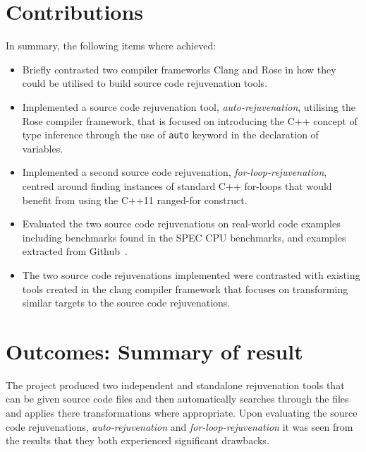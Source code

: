 \documentclass[bsc,frontabs,singlespacing,twoside,parskip,deptreport]{infthesis}
\begin{document}

    
\section{Contributions}
In summary, the following items where achieved:
\begin{itemize}
    \item Briefly contrasted two compiler frameworks Clang and Rose in how they could be utilised to build source code rejuvenation tools.
    \item Implemented a source code rejuvenation tool, \textit{auto-rejuvenation}, utilising the Rose compiler framework, that is focused on introducing the C++ concept of type inference through the use of \texttt{auto} keyword in the declaration of variables.
    \item Implemented a second source code rejuvenation, \textit{for-loop-rejuvenation}, centred around finding instances of standard  C++ for-loops that would benefit from using the C++11 ranged-for construct. 
    \item Evaluated the two source code rejuvenations on real-world code examples including benchmarks found in the SPEC CPU benchmarks, and examples extracted from Github~\cite{GITHUB}. 
    \item The two source code rejuvenations implemented were contrasted with existing tools created in the clang compiler framework that focuses on transforming similar targets to the source code rejuvenations.  
\end{itemize}

\section{Outcomes: Summary of result}

The project produced two independent and standalone rejuvenation tools that can be given source code files and then automatically searches through the files and applies there transformations where appropriate. Upon evaluating the source code rejuvenations, \textit{auto-rejuvenation} and \textit{for-loop-rejuvenation} it was seen from the results that they both experienced significant drawbacks.
\end{document}
